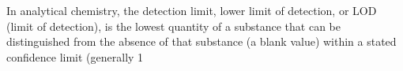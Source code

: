 In analytical chemistry, the detection limit, lower limit of detection, or LOD (limit of detection), is the lowest quantity of a substance that can be distinguished from the absence of that substance (a blank value) within a stated confidence limit (generally 1%

